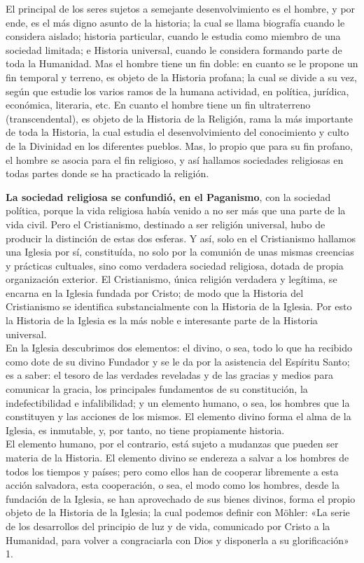 \raggedbottom{} \documentclass[12pt, a4paper, openany]{book} %
\begin{document}
El principal de los seres sujetos a semejante desenvolvimiento es el hombre, y por ende, es el más digno asunto de la historia; la cual se llama biografía cuando le considera aislado; historia particular, cuando le estudia como miembro de una sociedad limitada; e Historia universal, cuando le considera formando parte de toda la Humanidad. Mas el hombre tiene un fin doble: en cuanto se le propone un fin temporal y terreno, es objeto de la Historia profana; la cual se divide a su vez, según que estudie los varios ramos de la humana actividad, en política, jurídica, económica, literaria, etc. En cuanto el hombre tiene un fin ultraterreno (transcendental), es objeto de la Historia de la Religión, rama la más importante de toda la Historia, la cual estudia el desenvolvimiento del conocimiento y culto de la Divinidad en los diferentes pueblos. Mas, lo propio que para su fin profano, el hombre se asocia para el fin religioso, y así hallamos sociedades religiosas en todas partes donde se ha practicado la religión.

\textbf{La sociedad religiosa se confundió, en el Paganismo}, con la sociedad política, porque la vida religiosa había venido a no ser más que una parte de la vida civil. Pero el Cristianismo, destinado a ser religión universal, hubo de producir la distinción de estas dos esferas. Y así, solo en el Cristianismo hallamos una Iglesia por sí, constituída, no solo por la comunión de unas mismas creencias y prácticas cultuales, sino como verdadera sociedad religiosa, dotada de propia organización exterior. El Cristianismo, única religión verdadera y legítima, se encarna en la Iglesia fundada por Cristo; de modo que la Historia del Cristianismo se identifica substancialmente con la Historia de la Iglesia. Por esto la Historia de la Iglesia es la más noble e interesante parte de la Historia universal.\\
En la Iglesia descubrimos dos elementos: el divino, o sea, todo lo que ha recibido como dote de su divino Fundador y se le da por la asistencia del Espíritu Santo; es a saber: el tesoro de las verdades reveladas y de las gracias y medios para comunicar la gracia, los principales fundamentos de su constitución, la indefectibilidad e infalibilidad; y un elemento humano, o sea, los hombres que la constituyen y las acciones de los mismos. El elemento divino forma el alma de la Iglesia, es inmutable, y, por tanto, no tiene propiamente historia.\\
El elemento humano, por el contrario, está sujeto a mudanzas que pueden ser materia de la Historia. El elemento divino se endereza a salvar a los hombres de todos los tiempos y países; pero como ellos han de cooperar libremente a esta acción salvadora, esta cooperación, o sea, el modo como los hombres, desde la fundación de la Iglesia, se han aprovechado de sus bienes divinos, forma el propio objeto de la Historia de la Iglesia; la cual podemos definir con Möhler: «La serie de los desarrollos del principio de luz y de vida, comunicado por Cristo a la Humanidad, para volver a congraciarla con Dios y disponerla a su glorificación» 1.
\end{document}
